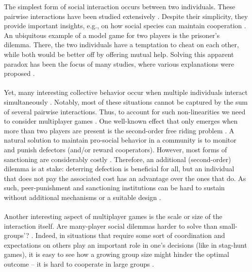 \documentclass[11pt]{article}
\theoremstyle{plainCl1}
\theoremstyle{plainCl2}
\begin{document}
The simplest form of social interaction occurs between two individuals. These pairwise interactions have been studied extensively \cite{bibid}. Despite their simplicity, they provide important insights, e.g., on how social species can maintain cooperation \cite{bibid}. An ubiquitous example of a model game for two players is the prisoner's dilemma. There, the two individuals have a temptation to cheat on each other, while both would be better off by offering mutual help. Solving this apparent paradox has been the focus of many studies, where various explanations were proposed \cite{bibid}. 
\\ \\
\noindent Yet, many interesting collective behavior occur when multiple individuals interact simultaneously \cite{Palm:JMB:1984, Skyrms:book:2003, Pacheco:PRSB:2009, Archetti:EL:2011, Archetti:JTB:2012, Gokhale:DGAA:2014, Hilbe:JTB:2015, Venkateswaran:PRSB:2019}.  %
Notably, most of these situations cannot be captured by the sum of several pairwise interactions. Thus, to account for such non-linearities we need to consider multiplayer games \cite{Gokhale:DGAA:2014}. One well-known effect that only emerges when more than two players are present is the second-order free riding problem \cite{Pal:NatCom:2022}. A natural solution to maintain pro-social behavior in a community is to monitor and punish defectors (and/or reward cooperators). However, most forms of sanctioning are considerably costly \cite{bibid}. Therefore, an additional (second-order) dilemma is at stake: deterring defection is beneficial for all, but an individual that does not pay the associated cost has an advantage over the ones that do. As such, peer-punishment and sanctioning institutions can be hard to sustain without additional mechanisms or a suitable design \cite{Couto:JTB:2020}. %
\\ \\
\noindent 
Another interesting aspect of multiplayer games is the scale or size of the interaction itself. Are many-player social dilemmas harder to solve than small-groups'? \cite{Skyrms:book:2003}. Indeed, in situations that require some sort of coordination and expectations on others play an important role in one's decisions (like in stag-hunt games), it is easy to see how a growing group size might hinder the optimal outcome -- it is hard to cooperate in large groups \cite{bibid}. %
\end{document}
